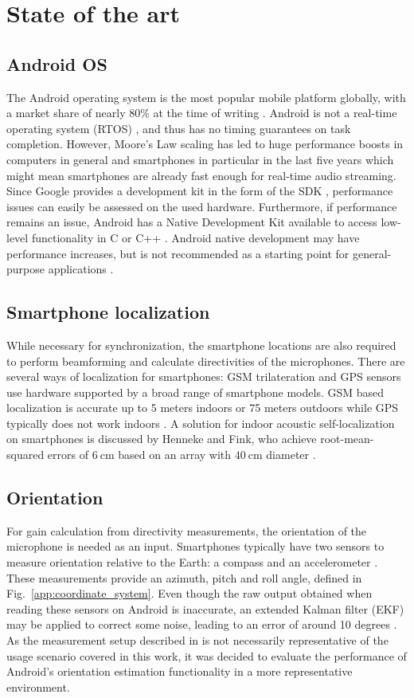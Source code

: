 \documentclass[a4paper, notitlepage]{report}
\begin{document}
\section{State of the art}
\subsection{Android OS} The Android operating system is the most popular mobile platform globally, with a market share of nearly 80\% at the time of writing \cite{IDC-android}. Android is not a real-time operating system (RTOS) \cite{Maya2010}, and thus has no timing guarantees on task completion. 
However, Moore's Law scaling has led to huge performance boosts in computers in general and smartphones in particular in the last five years which might mean smartphones are already fast enough for real-time audio streaming. Since Google provides a development kit in the form of the SDK \cite{android-getting-started}, performance issues can easily be assessed on the used hardware. Furthermore, if performance remains an issue, Android has a Native Development Kit available to access low-level functionality in C or C++ \cite{android-ndk}. Android native development may have performance increases, but is not recommended as a starting point for general-purpose applications \cite{liu2013}.

\subsection{Smartphone localization} While necessary for synchronization, the smartphone locations are also required to perform beamforming and calculate directivities of the microphones. There are several ways of localization for smartphones: GSM trilateration and GPS sensors use hardware supported by a broad range of smartphone models. GSM based localization is accurate up to 5 meters indoors or 75 meters outdoors \cite{varshavsky2006} while GPS typically does not work indoors \cite{wehr2004}. A solution for indoor acoustic self-localization on smartphones is discussed by Henneke and Fink, who achieve root-mean-squared errors of $6~\textrm{cm}$ based on an array with $40~\mathrm{cm}$ diameter \cite{hennecke2011}.

\subsection{Orientation} For gain calculation from directivity measurements, the orientation of the microphone is needed as an input. Smartphones typically have two sensors to measure orientation relative to the Earth: a compass and an accelerometer \cite{brahler2010}. These measurements provide an azimuth, pitch and roll angle, defined in Fig.~\ref{app:coordinate_system}. Even though the raw output obtained when reading these sensors on Android is inaccurate, an extended Kalman filter (EKF) may be applied to correct some noise, leading to an error of around 10 degrees \cite{goslinski2015}. As the measurement setup described in \cite{goslinski2015} is not necessarily representative of the usage scenario covered in this work, it was decided to evaluate the performance of Android's orientation estimation functionality in a more representative environment.
\end{document}
